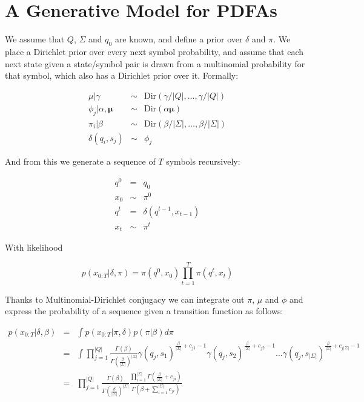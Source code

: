 \documentclass[11pt]{article}
\begin{document}
\section{A Generative Model for PDFAs}

We assume that $Q$, $\Sigma$ and $q_0$ are known, and define a prior over $\delta$ and $\pi$.  We place a Dirichlet prior over every next symbol probability, and assume that each next state given a state/symbol pair is drawn from a multinomial probability for that symbol, which also has a Dirichlet prior over it.  Formally:

\begin{eqnarray}
\mu|\gamma & \sim & \mathrm{Dir}\left(\gamma/|Q|,\ldots,\gamma/|Q|\right) \\
\phi_{j}|\alpha,\mathbf{\mu}  & \sim & \mathrm{Dir}(\alpha\mathbf{\mu}) \\
\pi_{i}|\beta & \sim & \mathrm{Dir}(\beta/|\Sigma|,\ldots,\beta/|\Sigma|)\\
\delta(q_i,s_j) & \sim & \phi_{j}
\end{eqnarray}

And from this we generate a sequence of $T$ symbols recursively:

\begin{eqnarray*}
q^0 & = & q_0 \\
x_0 & \sim & \pi^0 \\
q^t & = & \delta(q^{t-1},x_{t-1}) \\
x_t & \sim & \pi^t
\end{eqnarray*}

With likelihood

\[ p(x_{0:T}|\delta,\pi) = \pi(q^0,x_0)\prod_{t=1}^T \pi(q^t,x_t) \]

Thanks to Multinomial-Dirichlet conjugacy we can integrate out $\pi$, $\mu$ and $\phi$ and express the probability of a sequence given a transition function as follows:

\begin{eqnarray}
 p(x_{0:T}|\delta,\beta) & = & \int p(x_{0:T}|\pi,\delta) p(\pi|\beta) d\pi \\
 & = &  \int \prod_{j=1}^{|Q|} \frac{\Gamma(\beta)}{\Gamma(\frac{\beta}{|\Sigma|})^{|\Sigma|}} \gamma(q_j,s_1)^{\frac{\beta}{|\Sigma|}+c_{j1}-1} \gamma(q_j,s_2)^{\frac{\beta}{|\Sigma|}+c_{j2}-1} \ldots \gamma(q_j,s_{|\Sigma|})^{\frac{\beta}{|\Sigma|}+c_{j|\Sigma|}-1} \\
 & = & \prod_{j=1}^{|Q|} \frac{\Gamma(\beta)}{\Gamma(\frac{\beta}{|\Sigma|})^{|\Sigma|}} \frac{\prod_{i=1}^{|\Sigma|}\Gamma(\frac{\beta}{|\Sigma|} + c_{ji})}{\Gamma(\beta + \sum_{i=1}^{|\Sigma|} c_{ji})}
 \end{eqnarray}
 
\end{document}

